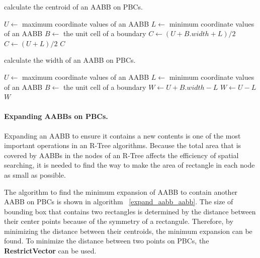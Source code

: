 \documentclass[10pt,letterpaper,twocolumn]{article}
\begin{document}
\begin{algorithm}
    \caption{calculate the centroid of an AABB on PBCs.}
    \label{center_aabb}
    \begin{algorithmic}
        \State $U \gets$ maximum coordinate values of an AABB
        \State $L \gets$ minimum coordinate values of an AABB
        \State $B \gets$ the unit cell of a boundary
                \State $C \gets (U + B.width + L) / 2$
            \Else
                \State $C \gets (U + L) / 2$
            \EndIf
            \State \Return $C$
        \EndFunction
     \end{algorithmic}
\end{algorithm}

\begin{algorithm}
    \caption{calculate the width of an AABB on PBCs.}
    \label{radius_aabb}
    \begin{algorithmic}
        \State $U \gets$ maximum coordinate values of an AABB
        \State $L \gets$ minimum coordinate values of an AABB
        \State $B \gets$ the unit cell of a boundary
                \State $W \gets U + B.width - L$
            \Else
                \State $W \gets U - L$
            \EndIf
            \State \Return $W$
        \EndFunction
     \end{algorithmic}
\end{algorithm}

\paragraph{Expanding AABBs on PBCs.}
Expanding an AABB to ensure it contains a new contents is one of the most
important operations in an R-Tree algorithms.
Because the total area that is covered by AABBs in the nodes of an R-Tree
affects the efficiency of spatial searching, it is needed to find the way to
make the area of rectangle in each node as small as possible.

The algorithm to find the minimum expansion of AABB to contain another AABB on
PBCs is shown in algorithm ~\ref{expand_aabb_aabb}.
The size of bounding box that contains two rectangles is determined by the
distance between their center points because of the symmetry of a rectangule.
Therefore, by minimizing the distance between their centroids, the minimum
expansion can be found. To minimize the distance between two points on PBCs,
the \textbf{RestrictVector} can be used.
\end{document}
